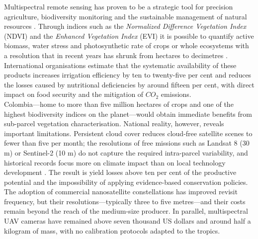 \noindent Multispectral remote sensing has proven to be a strategic tool
for precision agriculture, biodiversity monitoring and the sustainable
management of natural resources \cite{Chuvieco2010}.  Through indices
such as the \emph{Normalized Difference Vegetation Index} (NDVI) and the
\emph{Enhanced Vegetation Index} (EVI) it is possible to quantify active
biomass, water stress and photosynthetic rate of crops or whole
ecosystems with a resolution that in recent years has shrunk from
hectares to decimetres \cite{Xue2017Significant}.  International
organisations estimate that the systematic availability of these
products increases irrigation efficiency by ten to twenty-five per cent
and reduces the losses caused by nutritional deficiencies by around
fifteen per cent, with direct impact on food security and the mitigation
of \(CO_2\) emissions.\\

\noindent Colombia—home to more than five million hectares of crops and one of
the highest biodiversity indices on the planet—would obtain immediate
benefits from sub-parcel vegetation characterisation.  National reality,
however, reveals important limitations.  Persistent cloud cover reduces
cloud-free satellite scenes to fewer than five per month; the
resolutions of free missions such as Landsat 8 (30 m) or Sentinel-2
(10 m) do not capture the required intra-parcel variability, and
historical records focus more on climate impact than on local technology
development \cite{Poveda2001SeasonalityColombia}.  The result is yield
losses above ten per cent of the productive potential and the
impossibility of applying evidence-based conservation policies.\\

\noindent The adoption of commercial nanosatellite constellations has improved
revisit frequency, but their resolutions—typically three to five
metres—and their costs remain beyond the reach of the medium-size
producer.  In parallel, multispectral UAV cameras have remained above
seven thousand US dollars and around half a kilogram of mass, with no
calibration protocols adapted to the tropics.\\


